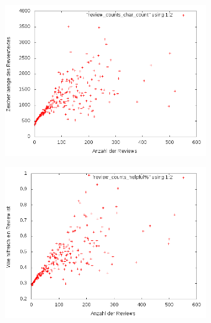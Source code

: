 \documentclass{scrartcl}
\theoremstyle{my_th_style}
\begin{document}
\begin{figure}[H]
   \includegraphics[width=0.8\textwidth]{_results/charcount.png}
\end{figure}
\begin{figure}[H]
   \includegraphics[width=0.8\textwidth]{_results/helpfull_count.png}
\end{figure}

\newpage
\end{document}

